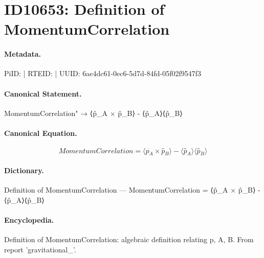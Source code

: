\section*{ID10653: Definition of MomentumCorrelation}
\paragraph{Metadata.}
PiID:  | RTEID:  | UUID: 6ae4dc61-0ec6-5d7d-84fd-05f02f9547f3

\paragraph{Canonical Statement.}
MomentumCorrelation" → ⟨p̂\_A × p̂\_B⟩ - ⟨p̂\_A⟩⟨p̂\_B⟩

\paragraph{Canonical Equation.}
\[
MomentumCorrelation = ⟨p̂_A × p̂_B⟩ - ⟨p̂_A⟩⟨p̂_B⟩
\]

\paragraph{Dictionary.}
Definition of MomentumCorrelation — MomentumCorrelation = ⟨p̂\_A × p̂\_B⟩ - ⟨p̂\_A⟩⟨p̂\_B⟩

\paragraph{Encyclopedia.}
Definition of MomentumCorrelation: algebraic definition relating p, A, B. From report 'gravitational\_'.
